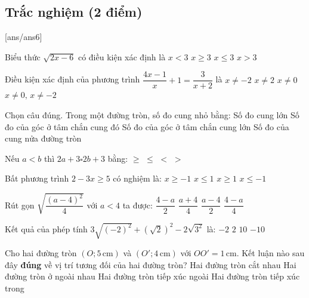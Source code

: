 \setcounter{ex}{0} %
\subsection{Trắc nghiệm (2 điểm)}
[ans/ans6]
\begin{ex}
Biểu thức $\sqrt{2x-6}$ có điều kiện xác định là
\choice
{$x<3$}
{\True $x\ge 3$}
{$x\le 3$}
{$x>3$}
\end{ex}

\begin{ex}
Điều kiện xác định của phương trình $\dfrac{4x-1}{x}+1=\dfrac{3}{x+2}$ là
\choice
{$x\neq -2$}
{$x\neq 2$}
{$x\neq 0$}
{\True $x\neq 0,\,x\neq -2$}
\end{ex}

\begin{ex}
Chọn câu đúng. Trong một đường tròn, số đo cung nhỏ bằng:
\choice
{Số đo cung lớn}
{\True Số đo của góc ở tâm chắn cung đó}
{Số đo của góc ở tâm chắn cung lớn}
{Số đo của cung nửa đường tròn}
\end{ex}

\begin{ex}
Nếu $a<b$ thì $2a+3 \square 2b+3$ bằng:
\choice
{$\ge$}
{$\le$}
{\True $<$}
{$>$}
\end{ex}

\begin{ex}
Bất phương trình $2-3x\ge 5$ có nghiệm là:
\choice
{$x\ge -1$}
{$x\le1$}
{$x\ge 1$}
{\True $x\le -1$}
\end{ex}

\begin{ex}
Rút gọn $\sqrt{\dfrac{(a-4)^2}{4}}$ với $a<4$ ta được:
\choice
{\True $\dfrac{4-a}{2}$}
{$\dfrac{a+4}{4}$}
{$\dfrac{a-4}{2}$}
{$\dfrac{4-a}{4}$}
\end{ex}

\begin{ex}
Kết quả của phép tính $3\sqrt{(-2)^2}+(\sqrt{2})^2-2\sqrt{3^2}$ là:
\choice
{$-2$}
{\True $2$}
{$10$}
{$-10$}
\end{ex}

\begin{ex}
Cho hai đường tròn $(O;5\,\text{cm})$ và $(O';4\,\text{cm})$ với $OO'=1\,\text{cm}$. Kết luận nào sau đây \textbf{đúng} về vị trí tương đối của hai đường tròn?
\choice
{Hai đường tròn cắt nhau}
{Hai đường tròn ở ngoài nhau}
{Hai đường tròn tiếp xúc ngoài}
{\True Hai đường tròn tiếp xúc trong}
\end{ex}

